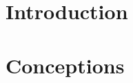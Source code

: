 \documentclass[11pt, english, screen, research-development]{report-rd-info}
\begin{document}
\begin{classification}
     \begin{comment}
   Bibliographic indexing is required. Use the ACM thesaurus:  See \url{http://www.acm.org/about/class/}. (The following example is based on the 1998 version, where general terms and additional key words are optional.)

   \category{H.2.8}{Database Applications}{Image databases}
   \category{H.3.3}{Information Search and Retrieval}{Clustering, Information filtering, Relevance feedback}
   \category{H.3.7}{Digital Libraries}{User issues}
   \category{I.5.3}{Clustering}{Algorithms, Similarity measures}
   \category{I.4.10}{Image Representation}{Statistical, Multidimensional}
   \terms{Algorithms, Performances, Experiments, Human factors, Verification.}
   \keywords{Content-based image retrieval system, Classification, Feedback loop, Supervised learning.}
   \end{comment}
\end{classification}
\begin{comment}
\begin{acknowledgements}
 
   The usual place of acknowledgements, if this pleases you or if the work has been conducted as part of a larger endeavour.
    
\end{acknowledgements}
\end{comment}




\maketitle



\newpage

\tableofcontents

\chapter{Introduction}



\chapter{Conceptions}

\end{document}
